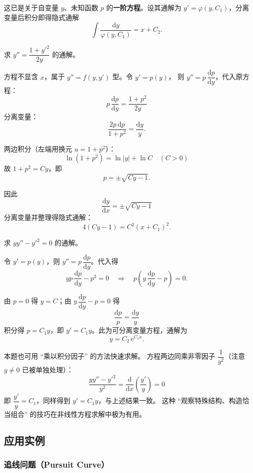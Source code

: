 \documentclass[lang=cn,11pt]{elegantbook}
\begin{document}
这已是关于自变量 $y$、未知函数 $p$ 的\textbf{一阶方程}。设其通解为 $y'=\varphi(y,C_1)$，分离变量后积分即得隐式通解
\[
\int\frac{\mathrm{d}y}{\varphi(y,C_1)}=x+C_2.
\]

\begin{exercise}
求 $y''=\dfrac{1+y'^{2}}{2y}$ 的通解。
\end{exercise}
\begin{solution}
方程不显含 $x$，属于 $y''=f(y,y')$ 型。令 $y'=p(y)$，
则 $y''=p\,\dfrac{\mathrm{d}p}{\mathrm{d}y}$，代入原方程：
\[
p\,\frac{\mathrm{d}p}{\mathrm{d}y}=\frac{1+p^{2}}{2y}
\]
分离变量：
\[
\frac{2p\,\mathrm{d}p}{1+p^{2}}=\frac{\mathrm{d}y}{y}.
\]

两边积分（左端用换元 $u=1+p^2$）：
\[
\ln(1+p^{2})=\ln|y|+\ln C \quad (C>0)
\]
故 $1+p^{2}=Cy$，即
\[
p=\pm\sqrt{Cy-1}.
\]

因此 
\[
\frac{\mathrm{d}y}{\mathrm{d}x}=\pm\sqrt{Cy-1}
\]
分离变量并整理得隐式通解：
\[
\boxed{4(Cy-1)=C^{2}(x+C_{1})^{2}.}
\]
\end{solution}

\begin{exercise}
求 $yy''-y'^{2}=0$ 的通解。
\end{exercise}
\begin{solution}
令 $y'=p(y)$，则 $y''=p\,\dfrac{\mathrm{d}p}{\mathrm{d}y}$。代入得
\[
yp\,\frac{\mathrm{d}p}{\mathrm{d}y}-p^{2}=0
\quad\Longrightarrow\quad
p\!\left(y\,\frac{\mathrm{d}p}{\mathrm{d}y}-p\right)=0.
\]

由 $p=0$ 得 $y=C$；由 $y\,\dfrac{\mathrm{d}p}{\mathrm{d}y}-p=0$ 得 
\[
\frac{\mathrm{d}p}{p}=\frac{\mathrm{d}y}{y}
\]
积分得 $p=C_{1}y$，即 $y'=C_{1}y$。此为可分离变量方程，通解为
\[
\boxed{y=C_{2}\,\mathrm{e}^{C_{1}x}.}
\]
\end{solution}

\begin{remark}[另解：凑全微分法]
本题也可用 ``乘以积分因子'' 的方法快速求解。
方程两边同乘非零因子 $\dfrac{1}{y^{2}}$（注意 $y \neq 0$ 已被单独处理）：
\[
\frac{yy''-y'^{2}}{y^{2}}
=\frac{\mathrm{d}}{\mathrm{d}x}\!\left(\frac{y'}{y}\right)=0
\]
即 $\dfrac{y'}{y}=C_{1}$，同样得到 $y'=C_{1}y$，与上述结果一致。
这种 ``观察特殊结构、构造恰当组合'' 的技巧在非线性方程求解中极为有用。
\end{remark}


\subsection{应用实例}


\subsubsection*{追线问题（Pursuit Curve）}
\end{document}
